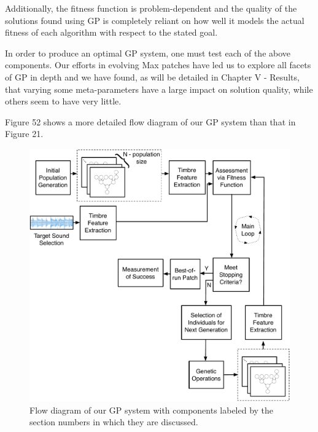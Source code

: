 \documentclass[12pt]{report} 	%
\numberwithin{figure}{chapter}
\numberwithin{table}{chapter}
\numberwithin{equation}{chapter}
\begin{document}
\begin{flushleft}
Additionally, the fitness function is problem-dependent and the quality of the solutions found using GP is completely reliant on how well it models the actual fitness of each algorithm with respect to the stated goal.

In order to produce an optimal GP system, one must test each of the above components. Our efforts in evolving Max patches have led us to explore all facets of GP in depth and we have found, as will be detailed in Chapter V - Results, that varying some meta-parameters have a large impact on solution quality, while others seem to have very little. 

Figure 52 shows a more detailed flow diagram of our GP system than that in Figure 21.
\begin{figure}[h!]
\begin{center}
\includegraphics[scale=0.5]{OverallGPSystem}
\caption[Flow diagram of overall GP system]{Flow diagram of our GP system with components labeled by the section numbers in which they are discussed.}
\end{center}
\vspace{6pt}
\end{figure}

\end{flushleft}
\end{document}
